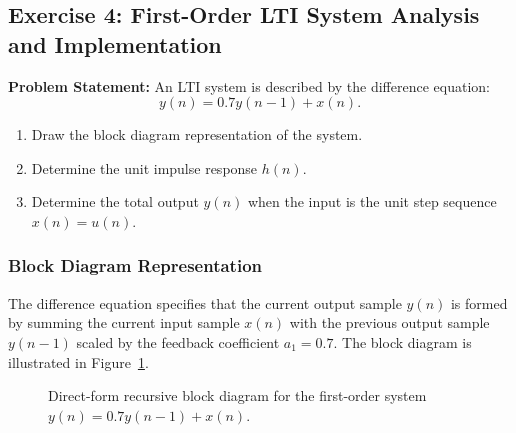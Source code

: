 \documentclass[12pt,a4paper]{article}
\begin{document}
\subsection{Exercise 4: First-Order LTI System Analysis and Implementation}
\textbf{Problem Statement:} An LTI system is described by the difference equation:
\begin{equation}
    y(n) = 0.7 y(n-1) + x(n).
    \label{eq:ex4_diff}
\end{equation}
\begin{enumerate}[label=(\alph*)]
    \item Draw the block diagram representation of the system.
    \item Determine the unit impulse response $h(n)$.
    \item Determine the total output $y(n)$ when the input is the unit step sequence $x(n) = u(n)$.
\end{enumerate}

\subsubsection{Block Diagram Representation}
The difference equation specifies that the current output sample $y(n)$ is formed by summing the current input sample $x(n)$ with the previous output sample $y(n-1)$ scaled by the feedback coefficient $a_1 = 0.7$. The block diagram is illustrated in Figure~\ref{fig:ex4_block_diagram}.

\begin{figure}[H]
    \centering
    \caption{Direct-form recursive block diagram for the first-order system $y(n) = 0.7y(n-1) + x(n)$.}
    \label{fig:ex4_block_diagram}
\end{figure}
\end{document}
